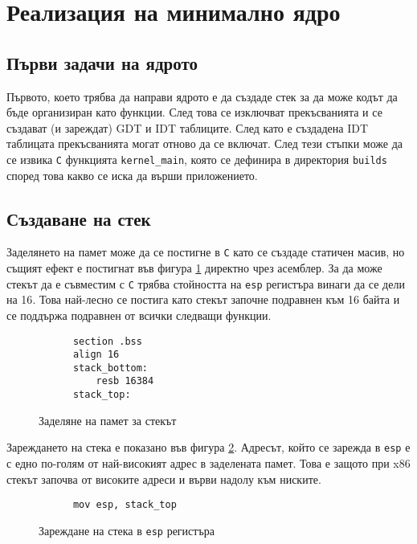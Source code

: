 \section{Реализация на минимално ядро}
  \subsection{Първи задачи на ядрото}
  Първото, което трябва да направи ядрото е да създаде стек за да може кодът да бъде организиран като функции. След това се изключват прекъсванията и се създават (и зареждат) GDT и IDT таблиците. След като е създадена IDT таблицата прекъсванията могат отново да се включат. След тези стъпки може да се извика {\tt C} функцията {\tt kernel\_main}, която се дефинира в директория {\tt builds} според това какво се иска да върши приложението.

  \subsection{Създаване на стек}
  Заделянето на памет може да се постигне в {\tt C} като се създаде статичен масив, но същият ефект е постигнат във фигура \ref{fig:stack-alloc} директно чрез асемблер. За да може стекът да е съвместим с {\tt C} трябва стойността на {\tt esp} регистъра винаги да се дели на 16\cite{sysvabi}. Това най-лесно се постига като стекът започне подравнен към 16 байта и се поддържа подравнен от всички следващи функции.

  \begin{figure}[htpb]
    \centering
    \caption{Заделяне на памет за стекът}
    \begin{verbatim}
      section .bss
      align 16
      stack_bottom:
          resb 16384
      stack_top:
    \end{verbatim}
    \label{fig:stack-alloc}
  \end{figure}

  Зареждането на стека е показано във фигура \ref{fig:stack-esp}. Адресът, който се зарежда в {\tt esp} е с едно по-голям от най-високият адрес в заделената памет. Това е защото при x86 стекът започва от високите адреси и върви надолу към ниските.

  \begin{figure}[htpb]
    \centering
    \caption{Зареждане на стека в {\tt esp} регистъра}
    \begin{verbatim}
      mov esp, stack_top
    \end{verbatim}
    \label{fig:stack-esp}
  \end{figure}

